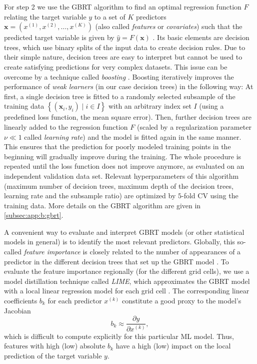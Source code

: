 For step 2 we use the \ac{GBRT} algorithm to find an optimal regression
function $F$ relating the target variable $y$ to a set of $K$ predictors
$\bm{x} = \left( x^{(1)}, x^{(2)}, \ldots, x^{(K)} \right)$ (also called
\emph{features} or \emph{covariates}) such that the predicted target variable
is given by $\hat{y} = F(\bm{x})$ \autocite{Death2007, Elith2008, Friedman2001,
  Friedman2002}. Its basic elements are decision trees, which use binary splits
of the input data to create decision rules. Due to their simple nature,
decision trees are easy to interpret but cannot be used to create satisfying
predictions for very complex datasets. This issue can be overcome by a
technique called \emph{boosting} \autocite{Freund1996}. Boosting iteratively
improves the performance of \emph{weak learners} (in our case decision trees)
in the following way: At first, a single decision tree is fitted to a randomly
selected subsample of the training data $\left\{ \left( \bm{x}_i, y_i \right)
\mid i \in I \right\}$ with an arbitrary index set $I$ (using a predefined loss
function, \eg{} the mean square error). Then, further decision trees are
linearly added to the regression function $F$ (scaled by a regularization
parameter $\nu \ll 1$ called \emph{learning rate}) and the model is fitted
again in the same manner. This ensures that the prediction for poorly modeled
training points in the beginning will gradually improve during the training.
The whole procedure is repeated until the loss function does not improve
anymore, as evaluated on an independent validation data set. Relevant
hyperparameters of this algorithm (maximum number of decision trees, maximum
depth of the decision trees, learning rate and the subsample ratio) are
optimized by $5$-fold \acf{CV} using the training data. More details on the
\ac{GBRT} algorithm are given in \cref{subsec:app:b:gbrt}.

A convenient way to evaluate and interpret \ac{GBRT} models (or other
statistical models in general) is to identify the most relevant predictors.
Globally, this so-called \emph{feature importance} is closely related to the
number of appearances of a predictor in the different decision trees that set
up the \ac{GBRT} model \autocite{Friedman2001}. To evaluate the feature
importance regionally (for the different grid cells), we use a model
distillation technique called \emph{\ac{LIME}}, which approximates the
\ac{GBRT} model with a local linear regression model for each grid cell
\autocite{Ribeiro2016}. The corresponding linear coefficients $b_k$ for each
predictor $x^{(k)}$ constitute a good proxy to the model's Jacobian
\begin{equation}
  b_k \approx \frac{\partial y}{\partial x^{(k)}},
  \label{eq:06:jacobian}
\end{equation}
which is difficult to compute explicitly for this particular \ac{ML} model.
Thus, features with high (low) absolute $b_k$ have a high (low) impact on the
local prediction of the target variable $y$.

